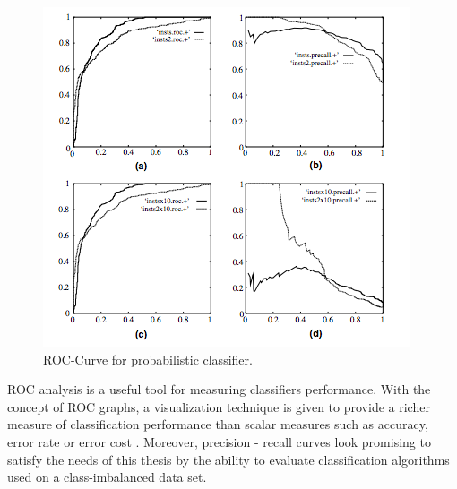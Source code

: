 \begin{figure}[h!]
    \centering
    \includegraphics[scale=0.8]{Graphics/curves-vs-pr-analysis.png}
    \caption{ROC-Curve for probabilistic classifier.}
    \label{fig:roc-pr-curve}
\end{figure}

ROC analysis is a useful tool for measuring classifiers performance. With the concept of ROC graphs, a visualization technique is given to provide a richer
measure of classification performance than scalar measures
such as accuracy, error rate or error cost \cite{Fawcett:2006:IRA:1159473.1159475}. Moreover, precision - recall curves look promising to satisfy the needs of this thesis by the ability to evaluate classification algorithms used on a class-imbalanced data set.

